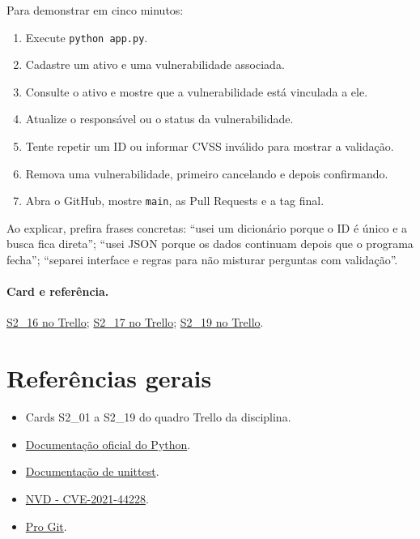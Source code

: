 \documentclass[11pt,a4paper]{article}
\newcommand{\referencia}[2]{\paragraph{Card e referência.}\href{#1}{#2}}
\begin{document}
Para demonstrar em cinco minutos:
\begin{enumerate}
  \item Execute \texttt{python app.py}.
  \item Cadastre um ativo e uma vulnerabilidade associada.
  \item Consulte o ativo e mostre que a vulnerabilidade está vinculada a ele.
  \item Atualize o responsável ou o status da vulnerabilidade.
  \item Tente repetir um ID ou informar CVSS inválido para mostrar a validação.
  \item Remova uma vulnerabilidade, primeiro cancelando e depois confirmando.
  \item Abra o GitHub, mostre \texttt{main}, as Pull Requests e a tag final.
\end{enumerate}

Ao explicar, prefira frases concretas: ``usei um dicionário porque o ID é único e a busca fica direta''; ``usei JSON porque os dados continuam depois que o programa fecha''; ``separei interface e regras para não misturar perguntas com validação''.

\referencia{https://trello.com/c/UvtQ6Mc6}{S2\_16 no Trello}; \href{https://trello.com/c/FBSYXNJP}{S2\_17 no Trello}; \href{https://trello.com/c/ADSVtVQ4}{S2\_19 no Trello}.

\section{Referências gerais}
\begin{itemize}
  \item Cards S2\_01 a S2\_19 do quadro Trello da disciplina.
  \item \href{https://docs.python.org/3/}{Documentação oficial do Python}.
  \item \href{https://docs.python.org/3/library/unittest.html}{Documentação de unittest}.
  \item \href{https://nvd.nist.gov/vuln/detail/CVE-2021-44228}{NVD - CVE-2021-44228}.
  \item \href{https://git-scm.com/book/pt-br/v2}{Pro Git}.
\end{itemize}
\end{document}
